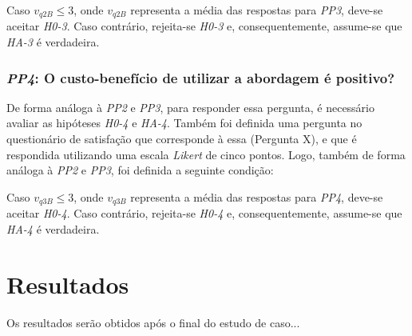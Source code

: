 Caso $v_{q2B} \le 3$, onde $v_{q2B}$ representa a média das respostas para \textit{PP3}, deve-se aceitar \textit{H0-3}. Caso contrário, rejeita-se \textit{H0-3} e, consequentemente, assume-se que \textit{HA-3} é verdadeira.

\subsubsection{\textit{PP4}: O custo-benefício de utilizar a abordagem é positivo?}

De forma análoga à \textit{PP2} e \textit{PP3}, para responder essa pergunta, é necessário avaliar as hipóteses \textit{H0-4} e \textit{HA-4}. Também foi definida uma pergunta no questionário de satisfação que corresponde à essa (Pergunta X), e que é respondida utilizando uma escala \textit{Likert} de cinco pontos. Logo, também de forma análoga à \textit{PP2} e \textit{PP3}, foi definida a seguinte condição:

Caso $v_{q3B} \le 3$, onde $v_{q3B}$ representa a média das respostas para \textit{PP4}, deve-se aceitar \textit{H0-4}. Caso contrário, rejeita-se \textit{H0-4} e, consequentemente, assume-se que \textit{HA-4} é verdadeira.

\section{Resultados}
\label{estudodecaso:resultados}

{\color{red} Os resultados serão obtidos após o final do estudo de caso...}
